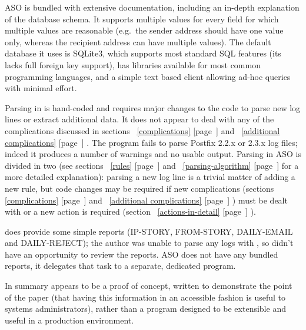 \documentclass[a4paper,12pt,draft]{article}
\newcommand{\parsername}{ASO}
\newcommand{\refwithpage}[1]{%
    \empty{}\ref{#1} [page~\pageref{#1}]%
}
\begin{document}
\parsername{} is bundled with extensive documentation, including an
in-depth explanation of the database schema.  It supports multiple values
for every field for which multiple values are reasonable (e.g.\ the sender
address should have one value only, whereas the recipient address can have
multiple values).  The default database it uses is SQLite3, which supports
most standard SQL features (its lacks full foreign key support), has
libraries available for most common programming languages, and a simple
text based client allowing ad-hoc queries with minimal effort.

Parsing in \LMA{} is hand-coded and requires major changes to the code to
parse new log lines or extract additional data.  It does not appear to deal
with any of the complications discussed in
sections~\refwithpage{complications} and~\refwithpage{additional
complications}.  The program fails to parse Postfix 2.2.x or 2.3.x log
files; indeed it produces a number of warnings and no usable output.
Parsing in \parsername{} is divided in two (see
sections~\refwithpage{rules} and~\refwithpage{parsing-algorithm} for a more
detailed explanation): parsing a new log line is a trivial matter of adding
a new rule, but code changes may be required if new complications
(sections~\refwithpage{complications} and~\refwithpage{additional
complications}) must be dealt with or a new action is required
(section~\refwithpage{actions-in-detail}).

\LMA{} does provide some simple reports (IP-STORY, FROM-STORY, DAILY-EMAIL
and DAILY-REJECT); the author was unable to parse any logs with \LMA{}, so
didn't have an opportunity to review the reports.  \parsername{} does not
have any bundled reports, it delegates that task to a separate, dedicated
program.

In summary \LMA{} appears to be a proof of concept, written to demonstrate
the point of the paper (that having this information in an accessible
fashion is useful to systems administrators), rather than a program
designed to be extensible and useful in a production environment.
\end{document}
